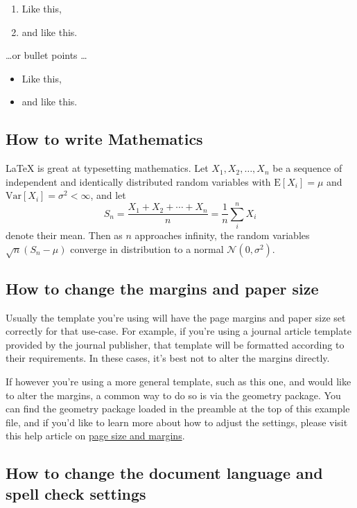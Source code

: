 \documentclass{article}
\begin{document}
\begin{enumerate}
\item Like this,
\item and like this.
\end{enumerate}
\dots or bullet points \dots
\begin{itemize}
\item Like this,
\item and like this.
\end{itemize}

\subsection{How to write Mathematics}

\LaTeX{} is great at typesetting mathematics. Let $X_1, X_2, \ldots, X_n$ be a sequence of independent and identically distributed random variables with $\text{E}[X_i] = \mu$ and $\text{Var}[X_i] = \sigma^2 < \infty$, and let
\[S_n = \frac{X_1 + X_2 + \cdots + X_n}{n}
      = \frac{1}{n}\sum_{i}^{n} X_i\]
denote their mean. Then as $n$ approaches infinity, the random variables $\sqrt{n}(S_n - \mu)$ converge in distribution to a normal $\mathcal{N}(0, \sigma^2)$.


\subsection{How to change the margins and paper size}

Usually the template you're using will have the page margins and paper size set correctly for that use-case. For example, if you're using a journal article template provided by the journal publisher, that template will be formatted according to their requirements. In these cases, it's best not to alter the margins directly.

If however you're using a more general template, such as this one, and would like to alter the margins, a common way to do so is via the geometry package. You can find the geometry package loaded in the preamble at the top of this example file, and if you'd like to learn more about how to adjust the settings, please visit this help article on \href{https://www.overleaf.com/learn/latex/page_size_and_margins}{page size and margins}.

\subsection{How to change the document language and spell check settings}
\end{document}
